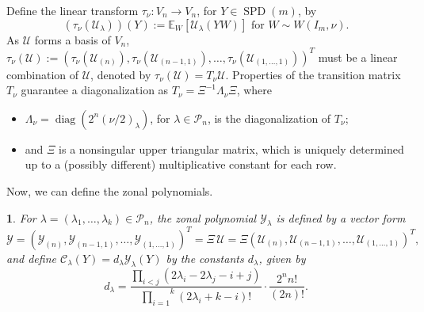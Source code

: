 \documentclass[smallextended]{svjour3}
\newtheorem{defn}[thm]{\protect\definitionname}
\DeclareMathOperator{\diag}{diag}
\newcommand{\SPD}{\operatorname{SPD}}
\providecommand{\definitionname}{Definition}
\begin{document}
\noindent
Define the linear transform $\tau_{\nu}\colon V_{n}\longrightarrow V_{n}$,
for $Y\in \SPD(m)$, by
\[
  (\tau_{\nu}(\mathcal{U}_{\lambda}))(Y) :=
  \mathbb{E}_{W}[\mathcal{U}_{\lambda}(YW)]\text{ for }W\sim W(I_m,\nu).
\]
As $\mathcal{U}$ forms a basis of $V_{n}$, $\tau_{\nu}(\mathcal{U}):=\left(\tau_{\nu}(\mathcal{U}_{(n)}),\tau_{\nu}(\mathcal{U}_{(n-1,1)}),\ldots,\tau_{\nu}(\mathcal{U}_{(1,\ldots,1)})\right)^{T}$
must be a linear combination of $\mathcal{U}$,
denoted by $\tau_{\nu}(\mathcal{U})=T_{\nu}\mathcal{U}$. 
Properties of the transition matrix $T_{\nu}$ guarantee a diagonalization as $T_{\nu}=\Xi^{-1}\Lambda_{\nu}\Xi$, where 
\begin{itemize}
\item $\Lambda_{\nu}=\diag(2^{n}(\nu/2)_{\lambda})$, for $\lambda\in\mathcal{P}_n$, is the diagonalization of $T_\nu$; 
\item and $\Xi$ is a nonsingular upper triangular matrix, which is uniquely
determined up to a (possibly different) multiplicative constant for
each row.
\end{itemize} 
Now, we can define the zonal polynomials.
\begin{defn}
For $\lambda=(\lambda_1,\ldots,\lambda_k)\in\mathcal{P}_{n}$, the zonal polynomial $\mathcal{Y}_{\lambda}$
is defined by a vector form
\begin{equation}\label{eq:ZonalY}
\mathcal{Y}=\left(\mathcal{Y}_{(n)}, \mathcal{Y}_{(n-1,1)}, \ldots, 
\mathcal{Y}_{(1,\ldots,1)}\right)^T
=\Xi\,\mathcal{U}=\Xi\left(\mathcal{U}_{(n)}, \mathcal{U}_{(n-1,1)}, \ldots, \mathcal{U}_{(1,\ldots,1)}
\right)^T\!\!,
\end{equation}
and define $\mathcal{C}_{\lambda}(Y)=d_{\lambda}\mathcal{Y}_{\lambda}(Y)$ by the constants $d_\lambda$, given by
\[
  d_{\lambda}=\frac{\underset{i<j}{\prod}(2\lambda_{i}-2\lambda_{j}-i+j)}{\overset{k}{\underset{i=1}{\prod}}(2\lambda_{i}+k-i)!}
  \cdot\frac{2^{n}n!}{(2n)!}.
\]
\end{defn}
\end{document}
